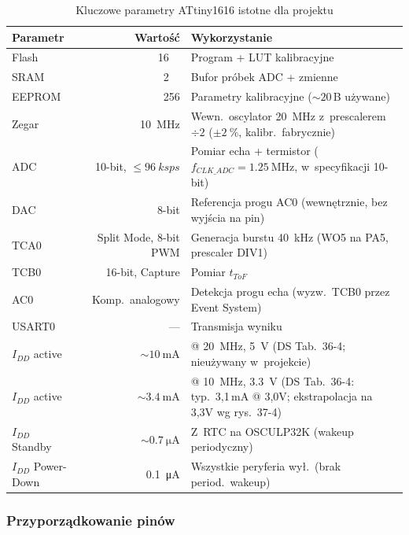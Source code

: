 \documentclass[a4paper,11pt]{article}
\begin{document}
	\begin{table}[H]
		\centering
		\caption{Kluczowe parametry ATtiny1616 istotne dla projektu}
		\label{tab:attiny}
		\begin{tabularx}{\textwidth}{l r X}
			\toprule
			\textbf{Parametr} & \textbf{Wartość} & \textbf{Wykorzystanie} \\
			\midrule
			Flash & \SI{16}{\kilo\byte} & Program + LUT kalibracyjne \\
			SRAM & \SI{2}{\kilo\byte} & Bufor próbek ADC + zmienne \\
			EEPROM & \SI{256}{\byte} & Parametry kalibracyjne (${\sim}20$\,B używane) \\
			Zegar & \SI{10}{\mega\hertz} & Wewn.\ oscylator \SI{20}{\mega\hertz} z~prescalerem $\div 2$ ($\pm\SI{2}{\percent}$, kalibr.\ fabrycznie) \\
			ADC & 10-bit, ${\leq}\SI{96}{ksps}$ & Pomiar echa + termistor ($f_{CLK\_ADC} = \SI{1,25}{\mega\hertz}$, w~specyfikacji 10-bit) \\
			DAC & 8-bit & Referencja progu AC0 (wewnętrznie, bez wyjścia na pin) \\
			TCA0 & Split Mode, 8-bit PWM & Generacja burstu \SI{40}{\kilo\hertz} (WO5 na PA5, prescaler DIV1) \\
			TCB0 & 16-bit, Capture & Pomiar $t_{ToF}$ \\
			AC0 & Komp.\ analogowy & Detekcja progu echa (wyzw.\ TCB0 przez Event System) \\
			USART0 & --- & Transmisja wyniku \\
			$I_{DD}$ active & ${\sim}\SI{10}{\milli\ampere}$ & @ \SI{20}{\mega\hertz}, \SI{5}{\volt} (DS Tab.~36-4; nieużywany w~projekcie) \\
			$I_{DD}$ active & ${\sim}\SI{3,4}{\milli\ampere}$ & @ \SI{10}{\mega\hertz}, \SI{3,3}{\volt} (DS Tab.~36-4: typ.\ 3{,}1\,mA @ 3{,}0V; ekstrapolacja na 3{,}3V wg rys.~37-4) \\
			$I_{DD}$ Standby & ${\sim}\SI{0,7}{\micro\ampere}$ & Z~RTC na OSCULP32K (wakeup periodyczny) \\
			$I_{DD}$ Power-Down & \SI{0,1}{\micro\ampere} & Wszystkie peryferia wył.\ (brak period.\ wakeup) \\
			\bottomrule
		\end{tabularx}
	\end{table}
	
	\subsubsection{Przyporządkowanie pinów}
	
\end{document}

